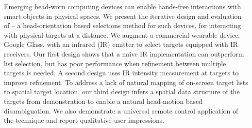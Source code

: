 

Emerging head-worn computing devices can enable hands-free interactions with smart objects in physical spaces. 
%
We present the iterative design and evaluation of \systemname -- a head-orientation based selections method for such devices, for interacting with physical targets at a distance. We augment a commercial wearable device, Google Glass, with an infrared (IR) emitter to select targets equipped with IR receivers. Our first design shows that a naive IR implementation can outperform list selection, but has poor performance when refinement between multiple targets is needed. A second design uses IR intensity measurement at targets to improve refinement. To address a lack of natural mapping of on-screen target lists to spatial target location, our third design infers a spatial data structure of the targets from demonstration to enable a natural head-motion based disambiguation.
%
We also demonstrate a universal remote control application of the technique and report qualitative user impressions.